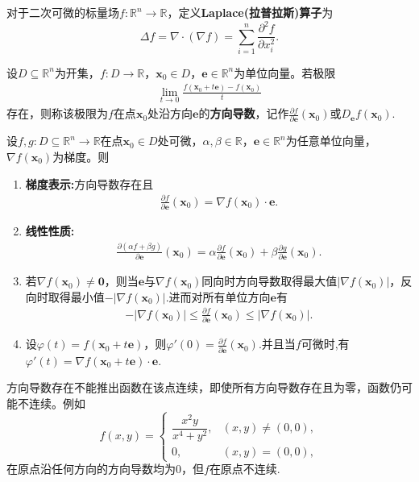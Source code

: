 \documentclass[../../main.tex]{subfiles}%
\begin{document}
\begin{definition}
对于二次可微的标量场$f:\mathbb{R}^n\to\mathbb{R}$，定义\textbf{Laplace(拉普拉斯)算子}为
\[
\Delta f=\nabla\cdot(\nabla f)=\sum_{i=1}^{n}\frac{\partial^{2}f}{\partial x_i^{2}}.
\]
\end{definition}

\begin{definition}
设$D\subseteq\mathbb{R}^n$为开集，$f:D\to\mathbb{R}$，$\bm{x}_0\in D$，$\bm{e}\in\mathbb{R}^n$为单位向量。若极限
\begin{align*}
\lim_{t\to 0}\frac{f(\bm{x}_0+t\bm{e})-f(\bm{x}_0)}{t}
\end{align*}
存在，则称该极限为$f$在点$\bm{x}_0$处沿方向$\bm{e}$的\textbf{方向导数}，记作$\frac{\partial f}{\partial\bm{e}}(\bm{x}_0)$或$D_{\bm{e}}f(\bm{x}_0)$.
\end{definition}

\begin{theorem}[方向导数的基本性质]
设$f,g:D\subseteq\mathbb{R}^n\to\mathbb{R}$在点$\bm{x}_0\in D$处可微，$\alpha,\beta\in\mathbb{R}$，$\bm{e}\in \mathbb{R}^n$为任意单位向量，$\nabla f(\bm{x}_0)$为梯度。则
\begin{enumerate}[(1)]
\item \textbf{梯度表示:}方向导数存在且
\begin{align*}
\frac{\partial f}{\partial\bm{e}}(\bm{x}_0)=\nabla f(\bm{x}_0)\cdot\bm{e}.
\end{align*}

\item \textbf{线性性质:}
\begin{align*}
\frac{\partial(\alpha f+\beta g)}{\partial\bm{e}}(\bm{x}_0)=\alpha\frac{\partial f}{\partial\bm{e}}(\bm{x}_0)+\beta\frac{\partial g}{\partial\bm{e}}(\bm{x}_0).
\end{align*}

\item 若$\nabla f(\bm{x}_0)\neq\bm{0}$，则当$\bm{e}$与$\nabla f(\bm{x}_0)$同向时方向导数取得最大值$|\nabla f(\bm{x}_0)|$，反向时取得最小值$-|\nabla f(\bm{x}_0)|$.进而对所有单位方向$\bm{e}$有
\begin{align*}
-|\nabla f(\bm{x}_0)|\leqslant\frac{\partial f}{\partial\bm{e}}(\bm{x}_0)\leqslant|\nabla f(\bm{x}_0)|.
\end{align*}

\item 设$\varphi(t)=f(\bm{x}_0+t\bm{e})$，则$\varphi'(0)=\frac{\partial f}{\partial\bm{e}}(\bm{x}_0)$.并且当$f$可微时,有$\varphi'(t)=\nabla f(\bm{x}_0+t\bm{e})\cdot\bm{e}$.
\end{enumerate}
\end{theorem}
\begin{remark}
方向导数存在不能推出函数在该点连续，即使所有方向导数存在且为零，函数仍可能不连续。例如
\[
f(x,y)=\begin{cases}\dfrac{x^{2}y}{x^{4}+y^{2}},&(x,y)\neq(0,0),\\0,&(x,y)=(0,0),\end{cases}
\]
在原点沿任何方向的方向导数均为$0$，但$f$在原点不连续.
\end{remark}
\end{document}
